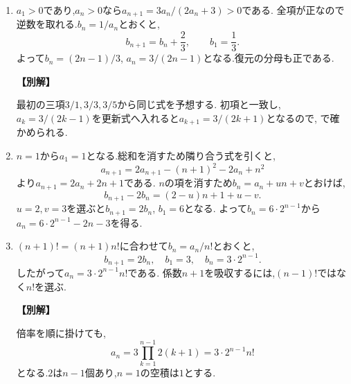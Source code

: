         \begin{enumerate}[label=\textbf{問\arabic*.},leftmargin=3.8em,format=\bookitemlink{practice-basic}{solution}{problem}]
          \item $a_1>0$であり,$a_n>0$なら$a_{n+1}=3a_n/(2a_n+3)>0$である.
                  全項が正なので逆数を取れる.$b_n=1/a_n$とおくと,
                  \[
                    b_{n+1}=b_n+\frac23,\qquad b_1=\frac13.
                  \]
                  よって$b_n=(2n-1)/3$, $a_n=3/(2n-1)$となる.復元の分母も正である.
                  \par\smallskip\noindent\textbf{【別解】}\par
                  最初の三項$3/1,3/3,3/5$から同じ式を予想する.
                  初項と一致し,$a_k=3/(2k-1)$を更新式へ入れると$a_{k+1}=3/(2k+1)$となるので,
                  で確かめられる.

          \item $n=1$から$a_1=1$となる.総和を消すため隣り合う式を引くと,
                  \[
                    a_{n+1}=2a_{n+1}-(n+1)^2-2a_n+n^2
                  \]
                  より$a_{n+1}=2a_n+2n+1$である.
                  $n$の項を消すため$b_n=a_n+un+v$とおけば,
                  \[
                    b_{n+1}-2b_n=(2-u)n+1+u-v.
                  \]
                  $u=2,v=3$を選ぶと$b_{n+1}=2b_n$, $b_1=6$となる.
                  よって$b_n=6\cdot2^{n-1}$から$a_n=6\cdot2^{n-1}-2n-3$を得る.

          \item $(n+1)!=(n+1)n!$に合わせて$b_n=a_n/n!$とおくと,
                  \[
                    b_{n+1}=2b_n,\quad b_1=3,\quad b_n=3\cdot2^{n-1}.
                  \]
                  したがって$a_n=3\cdot2^{n-1}n!$である.
                  係数$n+1$を吸収するには,$(n-1)!$ではなく$n!$を選ぶ.
                  \par\smallskip\noindent\textbf{【別解】}\par
                  倍率を順に掛けても,
                  \[
                    a_n=3\prod_{k=1}^{n-1}2(k+1)=3\cdot2^{n-1}n!
                  \]
                  となる.$2$は$n-1$個あり,$n=1$の空積は$1$とする.


\end{enumerate}

